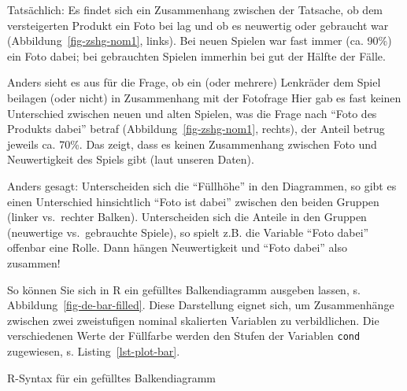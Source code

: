 \documentclass[
  a4paper,
  DIV=11]{scrreprt}
\newenvironment{Shaded}{\begin{snugshade}}{\end{snugshade}}
\newcommand{\AttributeTok}[1]{\textcolor[rgb]{0.40,0.45,0.13}{#1}}
\newcommand{\CommentTok}[1]{\textcolor[rgb]{0.37,0.37,0.37}{#1}}
\newcommand{\FunctionTok}[1]{\textcolor[rgb]{0.28,0.35,0.67}{#1}}
\newcommand{\NormalTok}[1]{\textcolor[rgb]{0.00,0.23,0.31}{#1}}
\newcommand{\SpecialCharTok}[1]{\textcolor[rgb]{0.37,0.37,0.37}{#1}}
\newcommand{\StringTok}[1]{\textcolor[rgb]{0.13,0.47,0.30}{#1}}
\theoremstyle{definition}
\theoremstyle{definition}
\theoremstyle{definition}
\theoremstyle{remark}
\begin{document}
Tatsächlich: Es findet sich ein Zusammenhang zwischen der Tatsache, ob
dem versteigerten Produkt ein Foto bei lag und ob es neuwertig oder
gebraucht war (Abbildung~\ref{fig-zshg-nom1}, links). Bei neuen Spielen
war fast immer (ca. 90\%) ein Foto dabei; bei gebrauchten Spielen
immerhin bei gut der Hälfte der Fälle.

Anders sieht es aus für die Frage, ob ein (oder mehrere) Lenkräder dem
Spiel beilagen (oder nicht) in Zusammenhang mit der Fotofrage Hier gab
es fast keinen Unterschied zwischen neuen und alten Spielen, was die
Frage nach ``Foto des Produkts dabei'' betraf
(Abbildung~\ref{fig-zshg-nom1}, rechts), der Anteil betrug jeweils ca.
70\%. Das zeigt, dass es keinen Zusammenhang zwischen Foto und
Neuwertigkeit des Spiels gibt (laut unseren Daten).

Anders gesagt: Unterscheiden sich die ``Füllhöhe'' in den Diagrammen, so
gibt es einen Unterschied hinsichtlich ``Foto ist dabei'' zwischen den
beiden Gruppen (linker vs.~rechter Balken). Unterscheiden sich die
Anteile in den Gruppen (neuwertige vs.~gebrauchte Spiele), so spielt
z.B. die Variable ``Foto dabei'' offenbar eine Rolle. Dann hängen
Neuwertigkeit und ``Foto dabei'' also zusammen!

So können Sie sich in R ein gefülltes Balkendiagramm ausgeben lassen, s.
Abbildung~\ref{fig-de-bar-filled}. Diese Darstellung eignet sich, um
Zusammenhänge zwischen zwei zweistufigen nominal skalierten Variablen zu
verbildlichen. Die verschiedenen Werte der Füllfarbe werden den Stufen
der Variablen \texttt{cond} zugewiesen, s. Listing~\ref{lst-plot-bar}.

\begin{codelisting}

\caption{\label{lst-plot-bar}R-Syntax für ein gefülltes Balkendiagramm}

\centering{

\begin{Shaded}
\begin{Highlighting}[]
\NormalTok{mariokart }\SpecialCharTok{\%\textgreater{}\%} 
  \FunctionTok{select}\NormalTok{(cond, stock\_photo) }\SpecialCharTok{\%\textgreater{}\%} 
  \FunctionTok{plot\_bar}\NormalTok{(}\AttributeTok{by =} \StringTok{"cond"}\NormalTok{)  }\CommentTok{\# aus dem Paket DataExplorer}
\end{Highlighting}
\end{Shaded}

}

\end{codelisting}%
\end{document}
